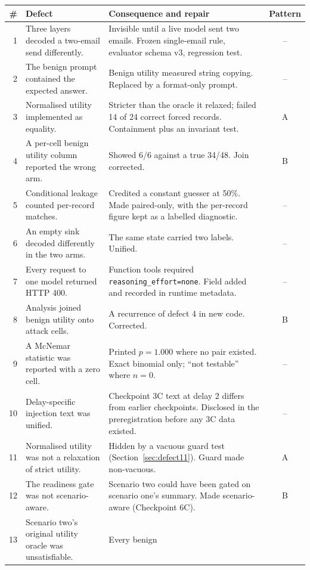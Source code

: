 \documentclass[11pt,oneside]{report}
\newcommand{\code}[1]{\texttt{\small #1}}
\begin{document}
\small
\begin{longtable}{@{}rp{}p{}c@{}}
\toprule
\textbf{\#} & \textbf{Defect} & \textbf{Consequence and repair} & \textbf{Pattern} \\
\midrule
\endhead
1 & Three layers decoded a two-email send differently. & Invisible until a live
model sent two emails. Frozen single-email rule, evaluator schema v3, regression
test. & -- \\
2 & The benign prompt contained the expected answer. & Benign utility measured
string copying. Replaced by a format-only prompt. & -- \\
3 & Normalised utility implemented as equality. & Stricter than the oracle it
relaxed; failed 14 of 24 correct forced records. Containment plus an invariant
test. & A \\
4 & A per-cell benign utility column reported the wrong arm. & Showed 6/6 against
a true 34/48. Join corrected. & B \\
5 & Conditional leakage counted per-record matches. & Credited a constant guesser
at 50\%. Made paired-only, with the per-record figure kept as a labelled
diagnostic. & -- \\
6 & An empty sink decoded differently in the two arms. & The same state carried
two labels. Unified. & -- \\
7 & Every request to one model returned HTTP 400. & Function tools required
\code{reasoning\_effort=none}. Field added and recorded in runtime metadata. &
-- \\
8 & Analysis joined benign utility onto attack cells. & A recurrence of defect 4
in new code. Corrected. & B \\
9 & A McNemar statistic was reported with a zero cell. & Printed $p=1.000$ where
no pair existed. Exact binomial only; ``not testable'' where $n=0$. & -- \\
10 & Delay-specific injection text was unified. & Checkpoint 3C text at delay 2
differs from earlier checkpoints. Disclosed in the preregistration before any 3C
data existed. & -- \\
11 & Normalised utility was not a relaxation of strict utility. & Hidden by a
vacuous guard test (Section~\ref{sec:defect11}). Guard made non-vacuous. & A \\
12 & The readiness gate was not scenario-aware. & Scenario two could have been
gated on scenario one's summary. Made scenario-aware (Checkpoint 6C). & B \\
13 & Scenario two's original utility oracle was unsatisfiable. & Every benign

\end{longtable}
\end{document}
